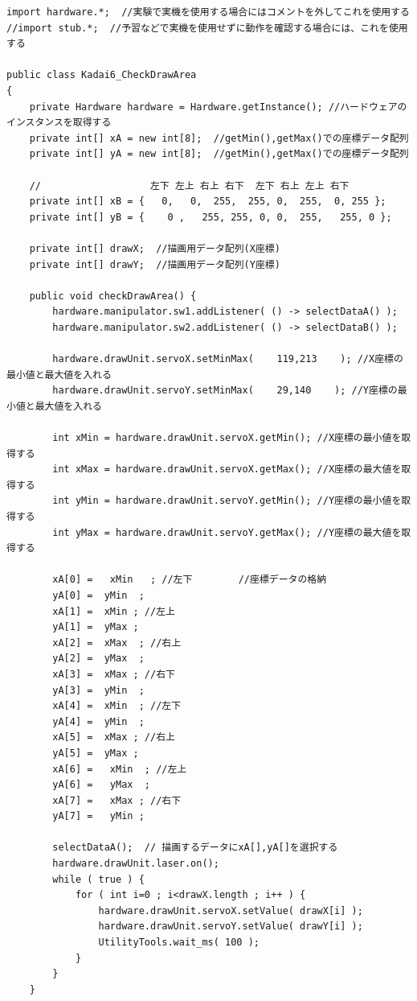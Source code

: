 \documentclass{jarticle}
\begin{document}
\begin{lstlisting}[caption=CheckDrawArea]
 import hardware.*;  //実験で実機を使用する場合にはコメントを外してこれを使用する
//import stub.*;  //予習などで実機を使用せずに動作を確認する場合には、これを使用する

public class Kadai6_CheckDrawArea
{
    private Hardware hardware = Hardware.getInstance(); //ハードウェアのインスタンスを取得する
    private int[] xA = new int[8];  //getMin(),getMax()での座標データ配列
    private int[] yA = new int[8];  //getMin(),getMax()での座標データ配列

    //                   左下 左上 右上 右下  左下 右上 左上 右下
    private int[] xB = {   0,   0,  255,  255, 0,  255,  0, 255 };
    private int[] yB = {    0 ,   255, 255, 0, 0,  255,   255, 0 };

    private int[] drawX;  //描画用データ配列(X座標)
    private int[] drawY;  //描画用データ配列(Y座標)

    public void checkDrawArea() {
        hardware.manipulator.sw1.addListener( () -> selectDataA() );
        hardware.manipulator.sw2.addListener( () -> selectDataB() );

        hardware.drawUnit.servoX.setMinMax(    119,213    ); //X座標の最小値と最大値を入れる
        hardware.drawUnit.servoY.setMinMax(    29,140    ); //Y座標の最小値と最大値を入れる

        int xMin = hardware.drawUnit.servoX.getMin(); //X座標の最小値を取得する
        int xMax = hardware.drawUnit.servoX.getMax(); //X座標の最大値を取得する
        int yMin = hardware.drawUnit.servoY.getMin(); //Y座標の最小値を取得する
        int yMax = hardware.drawUnit.servoY.getMax(); //Y座標の最大値を取得する

        xA[0] =   xMin   ; //左下        //座標データの格納
        yA[0] =  yMin  ; 
        xA[1] =  xMin ; //左上
        yA[1] =  yMax ;
        xA[2] =  xMax  ; //右上
        yA[2] =  yMax  ;
        xA[3] =  xMax ; //右下
        yA[3] =  yMin  ;
        xA[4] =  xMin  ; //左下
        yA[4] =  yMin  ; 
        xA[5] =  xMax ; //右上
        yA[5] =  yMax ;
        xA[6] =   xMin  ; //左上
        yA[6] =   yMax  ;
        xA[7] =   xMax ; //右下
        yA[7] =   yMin ;

        selectDataA();  // 描画するデータにxA[],yA[]を選択する
        hardware.drawUnit.laser.on();
        while ( true ) {
            for ( int i=0 ; i<drawX.length ; i++ ) {
                hardware.drawUnit.servoX.setValue( drawX[i] );
                hardware.drawUnit.servoY.setValue( drawY[i] );
                UtilityTools.wait_ms( 100 );
            }
        }
    }


\end{lstlisting}
\end{document}
